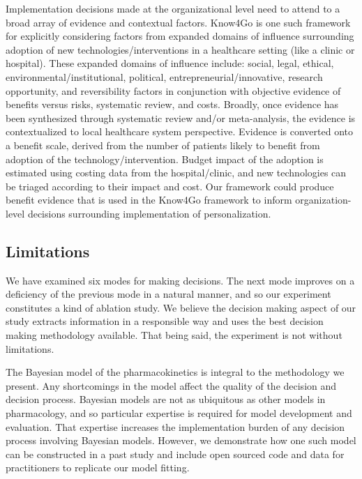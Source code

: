 Implementation decisions made at the organizational level need to attend to a broad array of evidence and contextual factors. Know4Go \cite{martin2016hospital} is one such framework for explicitly considering factors from expanded domains of influence surrounding adoption of new technologies/interventions in a healthcare setting (like a clinic or hospital). These expanded domains of influence include: social, legal, ethical, environmental/institutional, political, entrepreneurial/innovative, research opportunity, and reversibility factors in conjunction with objective evidence of benefits versus risks, systematic review, and costs.  Broadly, once evidence has been synthesized through systematic review and/or meta-analysis, the evidence is contextualized to local healthcare system perspective.  Evidence is converted onto a benefit scale, derived from the number of patients likely to benefit from adoption of the technology/intervention.  Budget impact of the adoption is estimated using costing data from the hospital/clinic, and new technologies can be triaged according to their impact and cost.  Our framework could produce benefit evidence that is used in the Know4Go framework to inform organization-level decisions surrounding implementation of personalization.


\subsection{Limitations}

We have examined six modes for making decisions.  The next mode improves on a deficiency of the previous mode in a natural manner, and so our experiment constitutes a kind of ablation study.  We believe the decision making aspect of our study extracts information in a responsible way and uses the best decision making methodology available.  That being said, the experiment is not without limitations.

The Bayesian model of the pharmacokinetics is integral to the methodology we present.  Any shortcomings in the model affect the quality of the decision and decision process.  Bayesian models are not as ubiquitous as other models in pharmacology, and so particular expertise is required for model development and evaluation.  That expertise increases the implementation burden of any decision process involving Bayesian models.  However, we demonstrate how one such model can be constructed in a past study \cite{pananos2020comparisons} and include open sourced code and data for practitioners to replicate our model fitting.

